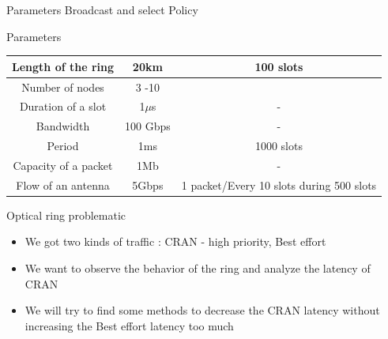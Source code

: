 \documentclass[10 pt]{beamer}
\begin{document}
\begin{frame}{Parameters}
 \centering Broadcast and select Policy 
 
 
 \begin{block}{Parameters}
\centering
  \begin{tabular}{|c|c|c|}
  \hline
  Length of the ring & 20km & 100 slots\\
   \hline
  Number of nodes & 3 -10 & \\
  \hline
  Duration of a slot & 1$\mu$s & -\\
  \hline
  Bandwidth & 100 Gbps & -\\
  \hline
    Period & 1ms & 1000 slots\\
  \hline
    Capacity of a packet & 1Mb & -\\
  \hline
      Flow of an antenna & 5Gbps & 1 packet/Every 10 slots during 500 slots\\
  \hline
  \end{tabular}

 \end{block}

\end{frame}

\begin{frame}{Optical ring problematic}
\begin{itemize}
\item We got two kinds of traffic : CRAN - high priority, Best effort
\vspace{1cm}
\item We want to observe the behavior of the ring and analyze the latency of CRAN
\vspace{1cm}
\item We will try to find some methods to decrease the CRAN latency without increasing the Best effort latency too much
\end{itemize}
\end{frame}
\end{document}
